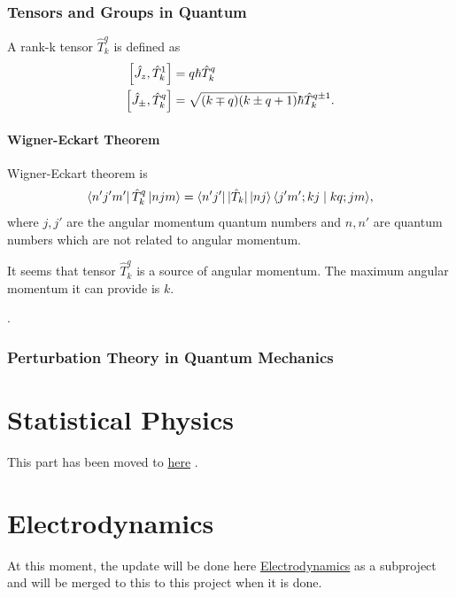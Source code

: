 \documentclass[letterpaper,10pt,english]{sphinxmanual}
\newcommand{\bra}[1]{\left\langle #1\right|}
\newcommand{\ket}[1]{\left| #1\right\rangle}
\newcommand{\braket}[2]{\langle #1 \mid #2 \rangle}
\begin{document}
\subsubsection{Tensors and Groups in Quantum}
\label{Quantum/tensors:tensors-and-groups-in-quantum}\label{Quantum/tensors::doc}
A rank-k tensor \(\hat T_k^q\) is defined as
\begin{gather}
\begin{split}\left[\hat J_z, \hat T_k^1 \right] &= q\hbar \hat T_k^q \\
\left[ \hat J_{\pm}, \hat T_k^q \right] & = \sqrt{(k\mp q)(k\pm q + 1)}\hbar \hat T_{k}^{q\pm 1} .\end{split}\notag
\end{gather}

\paragraph{Wigner-Eckart Theorem}
\label{Quantum/tensors:wigner-eckart-theorem}
Wigner-Eckart theorem is
\begin{gather}
\begin{split}\bra{n'j'm'}\hat T_k^q \ket{njm} = \bra{n'j'}\vert \hat T_k \vert \ket{nj} \braket{j'm';kj}{kq;jm},\end{split}\notag
\end{gather}
where \(j,j'\) are the angular momentum quantum numbers and \(n, n'\) are quantum numbers which are not related to angular momentum.

It seems that tensor \(\hat T_k^q\) is a source of angular momentum. The maximum angular momentum it can provide is \(k\).

.


\subsubsection{Perturbation Theory in Quantum Mechanics}
\label{Quantum/perturbationTheory::doc}\label{Quantum/perturbationTheory:perturbation-theory-in-quantum-mechanics}

\section{Statistical Physics}
\label{statmech/StatisticalPhysics::doc}\label{statmech/StatisticalPhysics:statistical-physics}
This part has been moved to \href{http://emptymalei.github.io/StatisticalPhysics/}{here} .


\section{Electrodynamics}
\label{electrodynamics:electrodynamics}\label{electrodynamics::doc}
At this moment, the update will be done here \href{http://electrodynamics.readthedocs.org/}{Electrodynamics} as a subproject and will be merged to this to this project when it is done.
\end{document}
